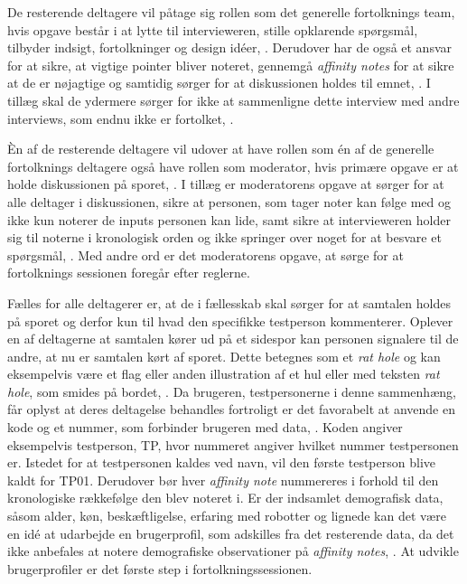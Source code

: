 De resterende deltagere vil påtage sig rollen som det generelle fortolknings team, hvis opgave består i at lytte til intervieweren, stille opklarende spørgsmål, tilbyder indsigt, fortolkninger og design idéer, \parencite[s. 108]{Book:CIInterpretationSession}. Derudover har de også et ansvar for at sikre, at vigtige pointer bliver noteret, gennemgå \textit{affinity notes} for at sikre at de er nøjagtige og samtidig sørger for at diskussionen holdes til emnet, \parencite[s. 108]{Book:CIInterpretationSession}. I tillæg skal de ydermere sørger for ikke at sammenligne dette interview med andre interviews, som endnu ikke er fortolket, \parencite[s. 108]{Book:CIInterpretationSession}. 

Èn af de resterende deltagere vil udover at have rollen som én af de generelle fortolknings deltagere også have rollen som moderator, hvis primære opgave er at holde diskussionen på sporet, \parencite[s. 108]{Book:CIInterpretationSession}. I tillæg er moderatorens opgave at sørger for at alle deltager i diskussionen, sikre at personen, som tager noter kan følge med og ikke kun noterer de inputs personen kan lide, samt sikre at intervieweren holder sig til noterne i kronologisk orden og ikke springer over noget for at besvare et spørgsmål, \parencite[ss. 108-109]{Book:CIInterpretationSession}. Med andre ord er det moderatorens opgave, at sørge for at fortolknings sessionen foregår efter reglerne. 

Fælles for alle deltagerer er, at de i fællesskab skal sørger for at samtalen holdes på sporet og derfor kun til hvad den specifikke testperson kommenterer. Oplever en af deltagerne at samtalen kører ud på et sidespor kan personen signalere til de andre, at nu er samtalen kørt af sporet. Dette betegnes som et \textit{rat hole} og kan eksempelvis være et flag eller anden illustration af et hul eller med teksten \textit{rat hole}, som smides på bordet, \parencite[s. 109]{Book:CIInterpretationSession}.\blankline
%   
Da brugeren, testpersonerne i denne sammenhæng, får oplyst at deres deltagelse behandles fortroligt  er det favorabelt at anvende en kode og et nummer, som forbinder brugeren med data, \parencite[s. 111]{Book:CIInterpretationSession}. Koden angiver eksempelvis testperson, TP, hvor nummeret angiver hvilket nummer testpersonen er. Istedet for at testpersonen kaldes ved navn, vil den første testperson blive kaldt for TP01. Derudover bør hver \textit{affinity note} nummereres i forhold til den kronologiske rækkefølge den blev noteret i. Er der indsamlet demografisk data, såsom alder, køn, beskæftligelse, erfaring med robotter og lignede kan det være en idé at udarbejde en brugerprofil, som adskilles fra det resterende data, da det ikke anbefales at notere demografiske observationer på \textit{affinity notes}, \parencite[s. 109]{Book:CIInterpretationSession}. At udvikle brugerprofiler er det første step i fortolkningssessionen. 

